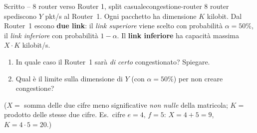 \documentclass{report}
\begin{document}
\begin{Exercise}{Scritto -- 8 router verso Router 1, split casuale}{congestione-router}
8 router spediscono $Y$ pkt/s al Router~1. Ogni pacchetto ha dimensione $K$
kilobit. Dal Router~1 escono \textbf{due link}: il \emph{link superiore} viene
scelto con probabilità $\alpha=50\%$, il \emph{link inferiore} con probabilità
$1-\alpha$. Il \textbf{link inferiore} ha capacità massima $X\cdot K$ kilobit/s.
\begin{enumerate}
\item[a)] In quale caso il Router~1 sarà \emph{di certo} congestionato? Spiegare.
\item[b)] Qual è il limite sulla dimensione di $Y$ (con $\alpha=50\%$) per non
creare congestione?
\end{enumerate}
\footnotesize($X=$ somma delle due cifre meno significative \emph{non nulle} della
matricola; $K=$ prodotto delle stesse due cifre. Es.\ cifre $e=4,\,f=5$:
$X=4+5=9$, $K=4\cdot5=20$.)
\end{Exercise}
\end{document}
